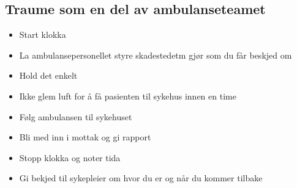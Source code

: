 				\subsection{Traume som en del av ambulanseteamet}
			\begin{itemize}
				\item Start klokka\\
				\item La ambulansepersonellet styre skadestedetm gjør som du får beskjed om\\
				\item Hold det enkelt\\
				\item Ikke glem luft for å få pasienten til sykehus innen en time\\
				\item Følg ambulansen til sykehuset\\
				\item Bli med inn i mottak og gi rapport\\
				\item Stopp klokka og noter tida\\
				\item Gi bekjed til sykepleier om hvor du er og når du kommer tilbake\\
			\end{itemize}
